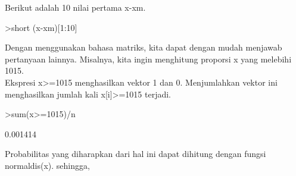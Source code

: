 \documentclass{article}
\begin{document}
\begin{eulernotebook}
\begin{eulercomment}
\begin{eulercomment}
\begin{eulercomment}
Berikut adalah 10 nilai pertama x-xm.
\end{eulercomment}
\begin{eulerprompt}
>short (x-xm)[1:10]
\end{eulerprompt}
\begin{euleroutput}
  [-6.0538,  -4.0672,  6.4207,  -0.99433,  -1.6961,  0.21205,  7.522,
  6.3826,  -8.5873,  1.7771]
\end{euleroutput}
\begin{eulercomment}
Dengan menggunakan bahasa matriks, kita dapat dengan mudah menjawab
pertanyaan lainnya. Misalnya, kita ingin menghitung proporsi x yang
melebihi 1015.\\
Ekspresi x\textgreater{}=1015 menghasilkan vektor 1 dan 0. Menjumlahkan vektor ini
menghasilkan jumlah kali x[i]\textgreater{}=1015 terjadi.
\end{eulercomment}
\begin{eulerprompt}
>sum(x>=1015)/n
\end{eulerprompt}
\begin{euleroutput}
  0.001414
\end{euleroutput}
\begin{eulercomment}
Probabilitas yang diharapkan dari hal ini dapat dihitung dengan fungsi
normaldis(x). sehingga,


\end{eulercomment}
\end{eulercomment}
\end{eulercomment}
\end{eulernotebook}
\end{document}

